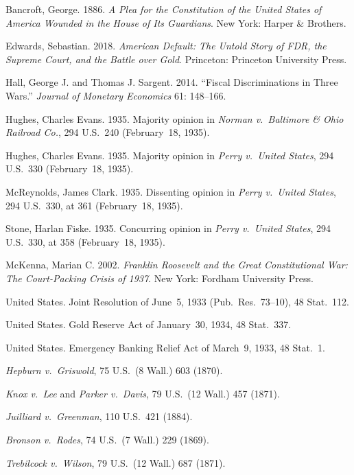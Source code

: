 \documentclass[12pt]{article}
\begin{document}
\begin{description}
\setlength\itemsep{0.5em}

\item Bancroft, George. 1886. \textit{A Plea for the Constitution of
the United States of America Wounded in the House of Its Guardians}.
New York: Harper \& Brothers.

\item Edwards, Sebastian. 2018. \textit{American Default: The Untold
Story of FDR, the Supreme Court, and the Battle over Gold}. Princeton:
Princeton University Press.

\item Hall, George J. and Thomas J. Sargent. 2014. ``Fiscal
Discriminations in Three Wars.'' \textit{Journal of Monetary Economics}
61: 148--166.

\item Hughes, Charles Evans. 1935. Majority opinion in \textit{Norman
v.\ Baltimore \& Ohio Railroad Co.}, 294 U.S.\ 240 (February~18,
1935).

\item Hughes, Charles Evans. 1935. Majority opinion in \textit{Perry
v.\ United States}, 294 U.S.\ 330 (February~18, 1935).

\item McReynolds, James Clark. 1935. Dissenting opinion in \textit{Perry
v.\ United States}, 294 U.S.\ 330, at 361 (February~18, 1935).

\item Stone, Harlan Fiske. 1935. Concurring opinion in \textit{Perry
v.\ United States}, 294 U.S.\ 330, at 358 (February~18, 1935).

\item McKenna, Marian C. 2002. \textit{Franklin Roosevelt and the
Great Constitutional War: The Court-Packing Crisis of 1937}. New York:
Fordham University Press.

\item United States. Joint Resolution of June~5, 1933 (Pub.\ Res.\
73--10), 48 Stat.\ 112.

\item United States. Gold Reserve Act of January~30, 1934, 48 Stat.\
337.

\item United States. Emergency Banking Relief Act of March~9, 1933, 48
Stat.\ 1.

\item \textit{Hepburn v.\ Griswold}, 75 U.S.\ (8 Wall.) 603 (1870).

\item \textit{Knox v.\ Lee} and \textit{Parker v.\ Davis}, 79 U.S.\
(12 Wall.) 457 (1871).

\item \textit{Juilliard v.\ Greenman}, 110 U.S.\ 421 (1884).

\item \textit{Bronson v.\ Rodes}, 74 U.S.\ (7 Wall.) 229 (1869).

\item \textit{Trebilcock v.\ Wilson}, 79 U.S.\ (12 Wall.) 687 (1871).

\end{description}
\end{document}
